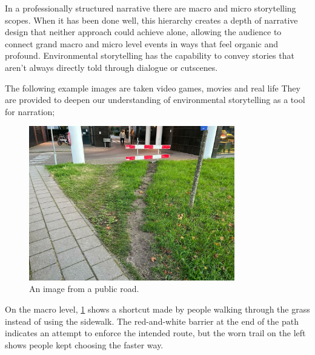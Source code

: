     In a professionally structured narrative there are macro and micro storytelling scopes\cite{Liminal_Space_Between_Embedded_and_Emergent_Narrative}. When it has been done well, this hierarchy creates a depth of narrative design that neither approach could achieve alone, allowing the audience to connect grand macro and micro level events in ways that feel organic and profound\cite{Environmental_Storytelling_Blogpost}. Environmental storytelling has the capability to convey stories that aren’t always directly told through dialogue or cutscenes.\par

    The following example images are taken video games, movies and real life They are provided to deepen our understanding of environmental storytelling as a tool for narration;

    \begin{figure}[H]
    \centering
    \includegraphics[width=0.8\textwidth]{images/environmental_storytelling_02}
    \caption{An image from a public road.}
    \label{fig:ES_01}
    \end{figure}

    On the macro level, \ref{fig:ES_01} shows a shortcut made by people walking through the grass instead of using the sidewalk. The red-and-white barrier at the end of the path indicates an attempt to enforce the intended route, but the worn trail on the left shows people kept choosing the faster way.\par

